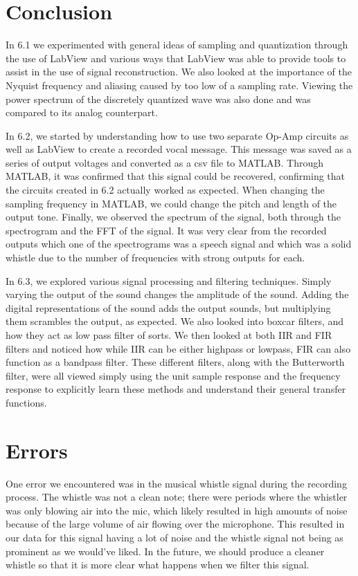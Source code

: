 \documentclass[10pt]{article}
\begin{document}
\section{Conclusion}

In 6.1 we experimented with general ideas of sampling and quantization through the use of LabView and various ways that LabView was able to provide tools to assist in the use of signal reconstruction. We also looked at the importance of the Nyquist frequency and aliasing caused by too low of a sampling rate. Viewing the power spectrum of the discretely quantized wave was also done and was compared to its analog counterpart.

In 6.2, we started by understanding how to use two separate Op-Amp circuits as well as LabView to create a recorded vocal message. This message was saved as a series of output voltages and converted as a csv file to MATLAB. Through MATLAB, it was confirmed that this signal could be recovered, confirming that the circuits created in 6.2 actually worked as expected. When changing the sampling frequency in MATLAB, we could change the pitch and length of the output tone. Finally, we observed the spectrum of the signal, both through the spectrogram and the FFT of the signal. It was very clear from the recorded outputs which one of the spectrograms was a speech signal and which was a solid whistle due to the number of frequencies with strong outputs for each. 

In 6.3, we explored various signal processing and filtering techniques. Simply varying the output of the sound changes the amplitude of the sound. Adding the digital representations of the sound adds the output sounds, but multiplying them scrambles the output, as expected. We also looked into boxcar filters, and how they act as low pass filter of sorts. We then looked at both IIR and FIR filters and noticed how while IIR can be either highpass or lowpass, FIR can also function as a bandpass filter. These different filters, along with the Butterworth filter, were all viewed simply using the unit sample response and the  frequency response to explicitly learn these methods and understand their general transfer functions. 

\medskip


\section{Errors}
One error we encountered was in the musical whistle signal during the recording process. The whistle was not a clean note; there were periods where the whistler was only blowing air into the mic, which likely resulted in high amounts of noise because of the large volume of air flowing over the microphone. This resulted in our data for this signal having a lot of noise and the whistle signal not being as prominent as we would've liked. In the future, we should produce a cleaner whistle so that it is more clear what happens when we filter this signal. 
 
\end{document}
